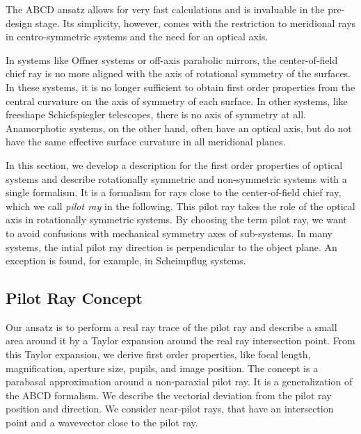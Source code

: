\documentclass[12pt,a4paper,twoside,openright,BCOR10mm,headsepline,titlepage,abstracton,chapterprefix,final]{scrreprt}
\begin{document}
The ABCD ansatz allows for very fast calculations and is invaluable in the pre-design stage.
Its simplicity, however, comes with the restriction to meridional rays in centro-symmetric systems and the need for an optical axis.

In systems like Offner systems or off-axis parabolic mirrors, the center-of-field chief ray is no more aligned with the axis of rotational symmetry of the surfaces.
In these systems, it is no longer sufficient to obtain first order properties from the central curvature on the axis of symmetry of each surface.
In other systems, like freeshape Schiefspiegler telescopes, there is no axis of symmetry at all. 
Anamorphotic systems, on the other hand, often have an optical axis, but do not have the same effective surface curvature in all meridional planes.

In this section, we develop a description for the first order properties of optical systems 
and describe rotationally symmetric and non-symmetric systems with a single formalism.
It is a formalism for rays close to the center-of-field chief ray, which we call \emph{pilot ray} in the following.
This pilot ray takes the role of the optical axis in rotationally symmetric systems. 
By choosing the term pilot ray, we want to avoid confusions with mechanical symmetry axes of sub-systems.
In many systems, the intial pilot ray direction is perpendicular to the object plane. 
An exception is found, for example, in Scheimpflug systems.

\subsection{Pilot Ray Concept} \label{subsec:pilotRayConcept}
Our ansatz is to perform a real ray trace of the pilot ray and describe a small area around it by a Taylor expansion around the real ray intersection point.
From this Taylor expansion, we derive first order properties, like focal length, magnification, aperture size, pupils, and image position.
The concept is a parabasal approximation around a non-paraxial pilot ray.
It is a generalization of the ABCD formalism. 
We describe the vectorial deviation from the pilot ray position and direction.
We consider near-pilot rays, that have an intersection point and a wavevector close to the pilot ray.
\end{document}

